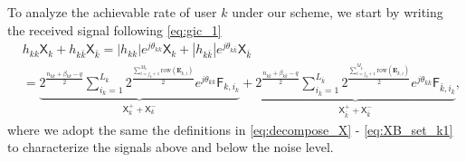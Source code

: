 \documentclass[12pt, draftclsnofoot, onecolumn]{IEEEtran}
\newcommand{\msf}[1]{\mathsf{#1}}
\theoremstyle{definition}
\begin{document}
To analyze the achievable rate of user $k$ under our scheme, we start by writing the received signal following \eqref{eq:gic_1}
\begin{align}\label{eq:XA_formal_complex}
&h_{kk}\msf{X}_k+h_{k\bar{k}}\msf{X}_{\bar{k}} =|h_{kk}|e^{j\theta_{kk}}\msf{X}_k+|h_{k\bar{k}}|e^{j\theta_{k\bar{k}}}\msf{X}_{\bar{k}} \nonumber \\
&= \underbrace{2^{\frac{n_{kk}+\beta_{kk}-q}{2}}\sum_{i_k=1}^{L_k}2^{\frac{\sum_{i=j_k+1}^{M_k}\text{row}(\boldsymbol{E}_{k,i})}{2}}e^{j\theta_{kk}}\msf{F}_{k,i_k}}_{\msf{X}_k^{+}+\msf{X}_k^{-}} %
+\underbrace{2^{\frac{n_{k\bar{k}}+\beta_{k\bar{k}}-q}{2}}\sum_{i_{\bar{k}}=1}^{L_{\bar{k}}}2^{\frac{\sum_{i=j_{\bar{k}}+1}^{M_{\bar{k}}}\text{row}(\boldsymbol{E}_{{\bar{k}},i})}{2}}e^{j\theta_{\bar{k}\bar{k}}}\msf{F}_{\bar{k},i_{\bar{k}}}}_{\msf{X}_{\bar{k}}^{+}+\msf{X}_{\bar{k}}^{-}}  ,%
\end{align}
where we adopt the same the definitions in \eqref{eq:decompose_X} - \eqref{eq:XB_set_k1} to characterize the signals above and below the noise level.
\end{document}
